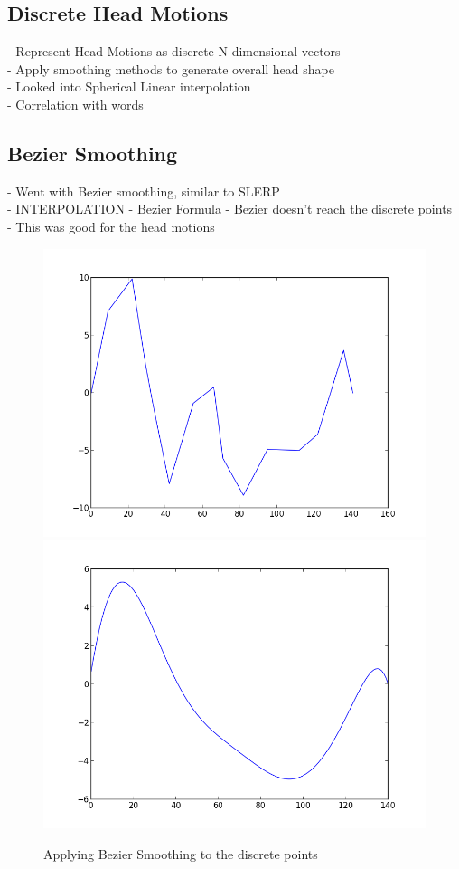 \documentclass[bsc,frontabs,twoside,singlespacing,parskip]{infthesis}
\begin{document}
\subsection{Discrete Head Motions}
- Represent Head Motions as discrete N dimensional vectors \\
- Apply smoothing methods to generate overall head shape \\
- Looked into Spherical Linear interpolation \\
\cite{rigid_head_motion}
- Correlation with words


\subsection{Bezier Smoothing}

- Went with Bezier smoothing, similar to SLERP\\
- INTERPOLATION
- Bezier Formula
- Bezier doesn't reach the discrete points\\
- This was good for the head motions \\

\begin{figure}
	\includegraphics[width=.6\textwidth]{figure_1.png}
	\includegraphics[width=.6\textwidth]{figure_2.png}
	\caption{Applying Bezier Smoothing to the discrete points}
\end{figure}
\end{document}
